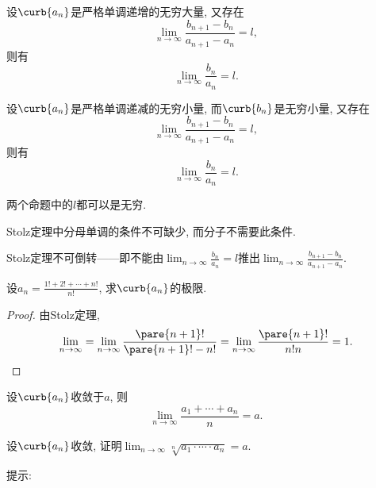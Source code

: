 \documentclass{ctexart}
\begin{document}
\begin{theorem}设$\curb{a_n}$是严格单调递增的无穷大量, 又存在
\[ \lim_{n\rightarrow\infty} \frac{b_{n+1}-b_n}{a_{n+1}-a_n} = l, \]
则有
\[ \lim_{n\rightarrow\infty} \frac{b_n}{a_n} = l. \]
\end{theorem}
\begin{theorem}设$\curb{a_n}$是严格单调递减的无穷小量, 而$\curb{b_n}$是无穷小量, 又存在
\[ \lim_{n\rightarrow\infty} \frac{b_{n+1}-b_n}{a_{n+1}-a_n} = l, \]
则有
\[ \lim_{n\rightarrow\infty} \frac{b_n}{a_n} = l. \]
\end{theorem}
\begin{remark}
    两个命题中的$l$都可以是无穷.
\end{remark}
\begin{pitfall}
    Stolz定理中分母单调的条件不可缺少, 而分子不需要此条件.
\end{pitfall}
\begin{pitfall}
    Stolz定理不可倒转——即不能由$\displaystyle \lim_{n\rightarrow\infty} \frac{b_n}{a_n} = l$推出$\displaystyle \lim_{n\rightarrow\infty} \frac{b_{n+1}-b_n}{a_{n+1}-a_n}$.
\end{pitfall}
\begin{sample}
    \begin{ex}
        设$\displaystyle a_n = \frac{1! + 2! + \cdots + n!}{n!}$, 求$\curb{a_n}$的极限.
    \end{ex}
    \begin{proof}
        由Stolz定理,
        \[ \lim_{n\rightarrow\infty} = \lim_{n\rightarrow\infty} \frac{\pare{n+1}!}{\pare{n+1}! - n!} = \lim_{n\rightarrow\infty} \frac{\pare{n+1}!}{n!n} = 1.\qedhere \]
    \end{proof}
\end{sample}
\begin{corollary}[Cauchy定理]
    设$\curb{a_n}$收敛于$a$, 则
    \[ \lim_{n\rightarrow \infty} \frac{a_1+\cdots+a_n}{n} = a. \]
\end{corollary}
\begin{sample}
    \begin{ex}
        设$\curb{a_n}$收敛, 证明$\displaystyle\lim_{n\rightarrow \infty} \sqrt[n]{a_1\cdot \cdots \cdot a_n} = a$.
    \end{ex}
    提示: 
\end{sample}

\end{document}
